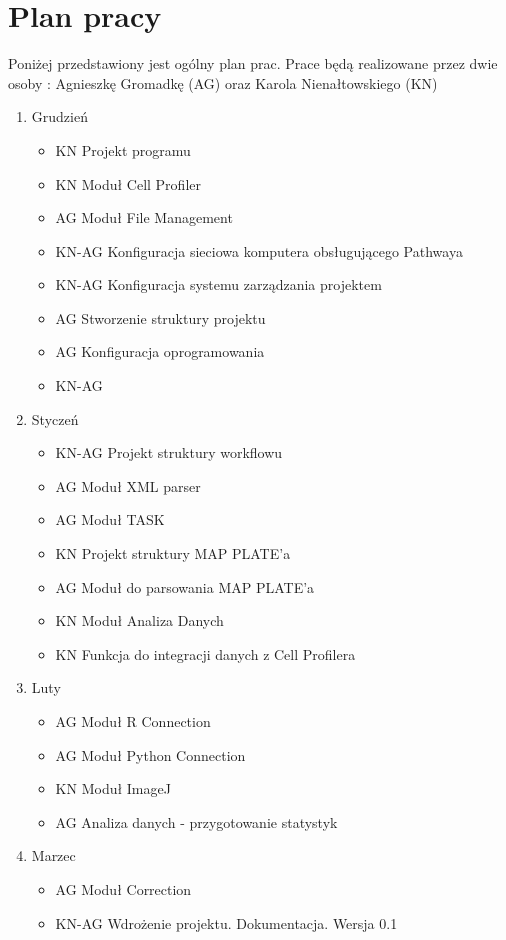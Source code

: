 \section{Plan pracy}

Poniżej przedstawiony jest ogólny plan prac. Prace będą realizowane przez dwie osoby : Agnieszkę Gromadkę (AG) oraz Karola Nienałtowskiego (KN)

\begin{enumerate} 
\item Grudzień
\begin{itemize}
\item KN Projekt programu
\item KN Moduł Cell Profiler
\item AG Moduł File Management
\item KN-AG Konfiguracja sieciowa komputera obsługującego Pathwaya
\item KN-AG Konfiguracja systemu zarządzania projektem 
\item AG Stworzenie struktury projektu
\item AG Konfiguracja oprogramowania
\item KN-AG
\end{itemize}
\item Styczeń
\begin{itemize}
\item KN-AG Projekt struktury workflowu
\item AG Moduł XML parser
\item AG Moduł TASK
\item KN Projekt struktury MAP PLATE'a
\item AG Moduł do parsowania MAP PLATE'a
\item KN Moduł Analiza Danych
\item KN Funkcja do integracji danych z Cell Profilera
\end{itemize}
\item Luty
\begin{itemize}
\item AG Moduł R Connection
\item AG Moduł Python Connection
\item KN Moduł  ImageJ
\item AG Analiza danych - przygotowanie statystyk
\end{itemize}
\item Marzec
\begin{itemize}
\item AG Moduł Correction
\item KN-AG Wdrożenie projektu. Dokumentacja. Wersja 0.1

\end{itemize}
\end{enumerate}
